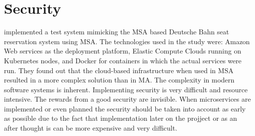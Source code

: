 \section{Security}
\begin{sloppypar}
    \citet{secconmsa} implemented a test system mimicking the MSA based Deutsche 
    Bahn seat reservation system using MSA. The technologies used in the study 
    were: Amazon Web services as the deployment platform, Elastic Compute Clouds 
    running on Kubernetes nodes, and Docker for containers in which the actual 
    services were run. They found out that the cloud-based infrastructure when 
    used in MSA resulted in a more complex solution than in MA. The complexity 
    in modern software systems is inherent. Implementing security is very 
    difficult and resource intensive. The rewards from a good security are 
    invisible. When microservices are implemented or even planned the security 
    should be taken into account as early as possible due to the fact that 
    implementation later on the projject or as an after thought is can be more 
    expensive and very difficult.
\end{sloppypar}


